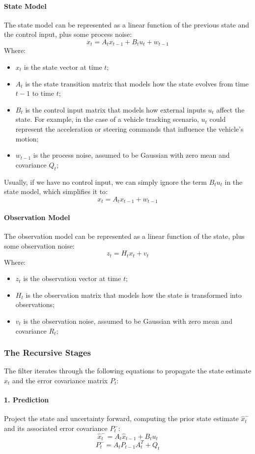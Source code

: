 \paragraph{State Model}
The state model can be represented as a linear function of the previous state and the control input, plus some process noise:
$$x_t = A_t x_{t-1} + B_t u_t + w_{t-1}$$ 
Where:
\begin{itemize}
    \item $x_t$ is the state vector at time $t$;
    \item $A_t$ is the state transition matrix that models how the state evolves from time $t-1$ to time $t$;
    \item $B_t$ is the control input matrix that models how external inputs $u_t$ affect the state. For example,
    in the case of a vehicle tracking scenario, $u_t$ could represent the acceleration or steering commands that influence the vehicle's motion;
    \item $w_{t-1}$ is the process noise, assumed to be Gaussian with zero mean and covariance $Q_t$;
\end{itemize}
Usually, if we have no control input, we can simply ignore the term $B_t u_t$ in the state model, which simplifies it to:
$$x_t = A_t x_{t-1} + w_{t-1}$$

\paragraph{Observation Model}
The observation model can be represented as a linear function of the state, plus some observation noise:
$$z_t = H_t x_t + v_t$$
Where:
\begin{itemize}
    \item $z_t$ is the observation vector at time $t$;
    \item $H_t$ is the observation matrix that models how the state is transformed into observations;
    \item $v_t$ is the observation noise, assumed to be Gaussian with zero mean and covariance $R_t$;
\end{itemize}

\subsubsection{The Recursive Stages}
The filter iterates through the following equations to propagate the state estimate $\hat{x}_t$ 
and the error covariance matrix $P_t$:

\paragraph{1. Prediction}
Project the state and uncertainty forward, computing the prior state estimate $\hat{x}_t^-$ 
and its associated error covariance $P_t^-$:
$$\hat{x}_t^- = A_t \hat{x}_{t-1} + B_t u_t$$
$$P_t^- = A_t P_{t-1} A_t^T + Q_t$$

